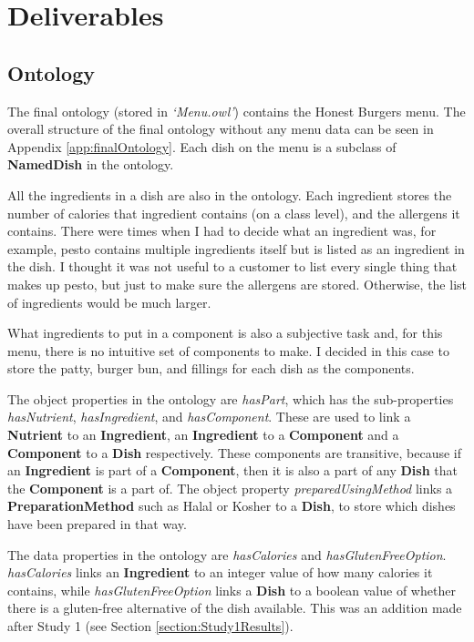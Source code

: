 \section{Deliverables}

\subsection{Ontology}

The final ontology (stored in \textit{`Menu.owl'}) contains the Honest Burgers \cite{honest_burgers_2023} menu. The overall structure of the final ontology without any menu data can be seen in Appendix \ref{app:finalOntology}. Each dish on the menu is a subclass of \textbf{NamedDish} in the ontology. 

All the ingredients in a dish are also in the ontology. Each ingredient stores the number of calories that ingredient contains (on a class level), and the allergens it contains. There were times when I had to decide what an ingredient was, for example, pesto contains multiple ingredients itself but is listed as an ingredient in the dish. I thought it was not useful to a customer to list every single thing that makes up pesto, but just to make sure the allergens are stored. Otherwise, the list of ingredients would be much larger.

What ingredients to put in a component is also a subjective task and, for this menu, there is no intuitive set of components to make. I decided in this case to store the patty, burger bun, and fillings for each dish as the components.

The object properties in the ontology are \textit{hasPart}, which has the sub-properties \textit{hasNutrient}, \textit{hasIngredient}, and \textit{hasComponent}. These are used to link a \textbf{Nutrient} to an \textbf{Ingredient}, an \textbf{Ingredient} to a \textbf{Component} and a \textbf{Component} to a \textbf{Dish} respectively. These components are transitive, because if an \textbf{Ingredient} is part of a \textbf{Component}, then it is also a part of any \textbf{Dish} that the \textbf{Component} is a part of. The object property \textit{preparedUsingMethod} links a \textbf{PreparationMethod} such as Halal or Kosher to a \textbf{Dish}, to store which dishes have been prepared in that way.

The data properties in the ontology are \textit{hasCalories} and \textit{hasGlutenFreeOption}. \textit{hasCalories} links an \textbf{Ingredient} to an integer value of how many calories it contains, while \textit{hasGlutenFreeOption} links a \textbf{Dish} to a boolean value of whether there is a gluten-free alternative of the dish available. This was an addition made after Study 1 (see Section \ref{section:Study1Results}).

